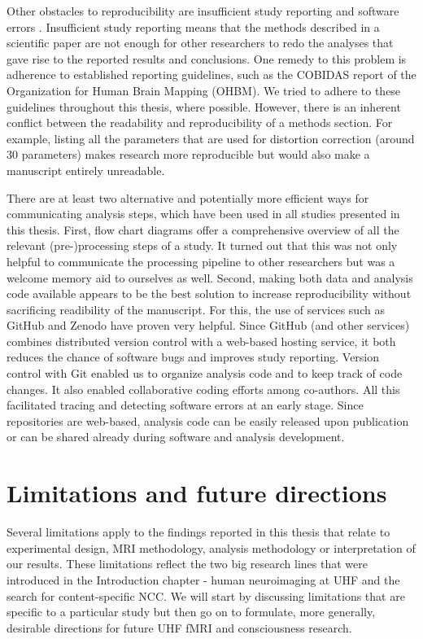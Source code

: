 Other obstacles to reproducibility are insufficient study reporting and software errors \parencite{Eklund2016}. Insufficient study reporting means that the methods described in a scientific paper are not enough for other researchers to redo the analyses that gave rise to the reported results and conclusions. One remedy to this problem is adherence to established reporting guidelines, such as the COBIDAS report \parencite{Nichols2017} of the Organization for Human Brain Mapping (OHBM). We tried to adhere to these guidelines throughout this thesis, where possible. However, there is an inherent conflict between the readability and reproducibility of a methods section. For example, listing all the parameters that are used for distortion correction (around 30 parameters) makes research more reproducible but would also make a manuscript entirely unreadable.

There are at least two alternative and potentially more efficient ways for communicating analysis steps, which have been used in all studies presented in this thesis. First, flow chart diagrams offer a comprehensive overview of all the relevant (pre-)processing steps of a study. It turned out that this was not only helpful to communicate the processing pipeline to other researchers but was a welcome memory aid to ourselves as well. Second, making both data and analysis code available appears to be the best solution to increase reproducibility without sacrificing readibility of the manuscript. For this, the use of services such as GitHub and Zenodo have proven very helpful. Since GitHub (and other services) combines distributed version control with a web-based hosting service, it both reduces the chance of software bugs and improves study reporting. Version control with Git enabled us to organize analysis code and to keep track of code changes. It also enabled collaborative coding efforts among co-authors. All this facilitated tracing and detecting software errors at an early stage. Since repositories are web-based, analysis code can be easily released upon publication or can be shared already during software and analysis development.

\section{Limitations and future directions}
Several limitations apply to the findings reported in this thesis that relate to experimental design, MRI methodology, analysis methodology or interpretation of our results. These limitations reflect the two big research lines that were introduced in the Introduction chapter - human neuroimaging at UHF and the search for content-specific NCC. We will start by discussing limitations that are specific to a particular study but then go on to formulate, more generally, desirable directions for future UHF fMRI and consciousness research.

